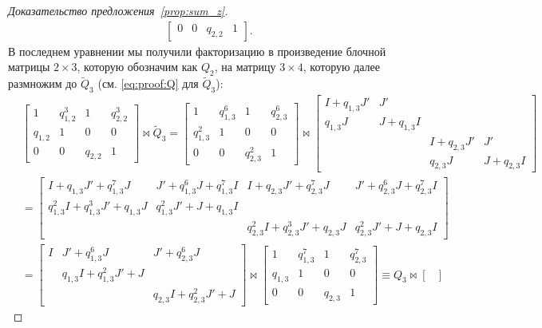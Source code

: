 \begin{proof}[Доказательство предложения~\ref{prop:sum_z}]
\[\begin{split}
\begin{bmatrix}
	0 & 0 & q_{2,2} & 1 
	\end{bmatrix}.
	\end{split} 
	\]
	В последнем уравнении мы получили факторизацию в произведение блочной матрицы $2\times 3$, которую обозначим как $Q_2$, на матрицу $3\times 4$, которую далее размножим до ${\widetilde Q}_3$ (см. \eqref{eq:proof:Q} для ${\widetilde Q}_3$):
	\[
	\begin{split}
	&\begin{bmatrix}
	1 & q_{1,2}^3 & 1 & q_{2,2}^3 \\
	q_{1,2}& 1 & 0 & 0 \\
	0 & 0 & q_{2,2} & 1 
	\end{bmatrix}
	\Join
	{\widetilde Q}_3 
	=
	\begin{bmatrix}
	1 & q_{1,3}^6 & 1 & q_{2,3}^6\\
	q_{1,3}^2& 1 & 0 & 0 \\
	0 & 0 & q_{2,3}^2 & 1 
	\end{bmatrix}
	\Join
	\begin{bmatrix}
	I + q_{1,3} J' & J' \\
	q_{1,3} J & J + q_{1,3} I \\
	& & I + q_{2,3} J' & J' \\
	& & q_{2,3} J & J + q_{2,3} I
	\end{bmatrix}
	\\
	& = 
	\begin{bmatrix}
	I + q_{1,3} J' + q_{1,3}^7 J & J' + q_{1,3}^6 J + q_{1,3}^7 I & I + q_{2,3} J' + q_{2,3}^7 J & J' + q_{2,3}^6 J + q_{2,3}^7 I \\
	q_{1,3}^2 I + q_{1,3}^3 J' + q_{1,3} J  & q_{1,3}^2 J' + J + q_{1,3} I & & \\
	& & q_{2,3}^2 I + q_{2,3}^3 J' + q_{2,3} J  & q_{2,3}^2 J' + J + q_{2,3} I 
	\end{bmatrix}
	\\
	& = 
	\begin{bmatrix}
	I & J' + q_{1,3}^6 J & J' + q_{2,3}^6 J \\
	& q_{1,3} I + q_{1,3}^2 J' + J \\
	& & q_{2,3} I + q_{2,3}^2 J' + J
	\end{bmatrix}
	\Join
	\begin{bmatrix}
	1 & q_{1,3}^7 & 1 & q_{2,3}^7 \\
	q_{1,3} & 1 & 0 & 0 \\
	0 & 0 & q_{2,3} & 1
	\end{bmatrix}
	\equiv 
	Q_3 \Join
	\begin{bmatrix}

\end{bmatrix}
\end{split}\]
\end{proof}
